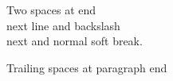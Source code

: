 Two spaces at end\\
next line and backslash\\
next and normal soft break.

Trailing spaces at paragraph end
